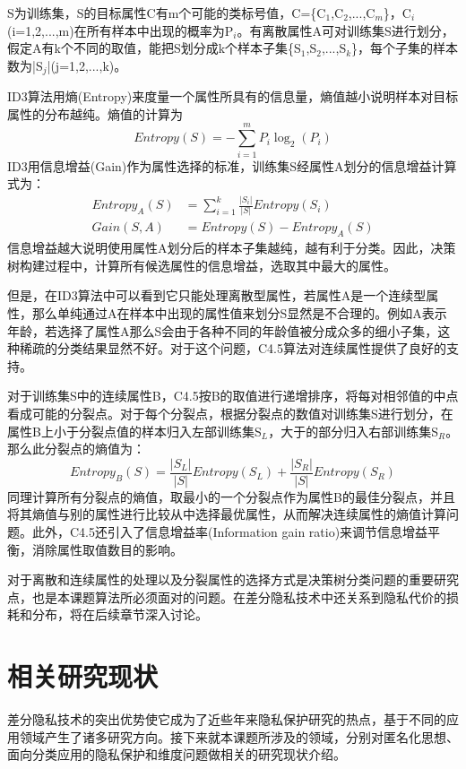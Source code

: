 \begin{exmp}
	\label{exmp_ID3}
	S为训练集，S的目标属性C有m个可能的类标号值，C=\{C$_{1}$,C$_{2}$,...,C$_{m}$\}，C$_{i}$(i=1,2,...,m)在所有样本中出现的概率为P$_{i}$。有离散属性A可对训练集S进行划分，假定A有k个不同的取值，能把S划分成k个样本子集\{S$_{1}$,S$_{2}$,...,S$_{k}$\}，每个子集的样本数为|S$_{j}$|(j=1,2,...,k)。
\end{exmp}
ID3算法用熵(Entropy)来度量一个属性所具有的信息量，熵值越小说明样本对目标属性的分布越纯。熵值的计算为
\[
	Entropy(S) = -\sum_{i=1}^{m}P_{i}\log_{2}(P_{i})
\]
ID3用信息增益(Gain)作为属性选择的标准，训练集S经属性A划分的信息增益计算式为：
\[
\begin{split}
	Entropy_{A}(S) &= \sum_{i=1}^{k}\frac{|S_{i}|}{|S|}Entropy(S_{i})\\
	Gain(S,A) &= Entropy(S)-Entropy_{A}(S)
\end{split}
\]
信息增益越大说明使用属性A划分后的样本子集越纯，越有利于分类。因此，决策树构建过程中，计算所有候选属性的信息增益，选取其中最大的属性。

但是，在ID3算法中可以看到它只能处理离散型属性，若属性A是一个连续型属性，那么单纯通过A在样本中出现的属性值来划分S显然是不合理的。例如A表示年龄，若选择了属性A那么S会由于各种不同的年龄值被分成众多的细小子集，这种稀疏的分类结果显然不好。对于这个问题，C4.5算法对连续属性提供了良好的支持。

对于训练集S中的连续属性B，C4.5按B的取值进行递增排序，将每对相邻值的中点看成可能的分裂点。对于每个分裂点，根据分裂点的数值对训练集S进行划分，在属性B上小于分裂点值的样本归入左部训练集S$_{L}$，大于的部分归入右部训练集S$_{R}$。那么此分裂点的熵值为：
\[
	Entropy_{B}(S) = \frac{|S_{L}|}{|S|}Entropy(S_{L})+\frac{|S_{R}|}{|S|}Entropy(S_{R})
\]
同理计算所有分裂点的熵值，取最小的一个分裂点作为属性B的最佳分裂点，并且将其熵值与别的属性进行比较从中选择最优属性，从而解决连续属性的熵值计算问题。此外，C4.5还引入了信息增益率(Information gain ratio)来调节信息增益平衡，消除属性取值数目的影响。

对于离散和连续属性的处理以及分裂属性的选择方式是决策树分类问题的重要研究点，也是本课题算法所必须面对的问题。在差分隐私技术中还关系到隐私代价的损耗和分布，将在后续章节深入讨论。

\section{相关研究现状} %

差分隐私技术的突出优势使它成为了近些年来隐私保护研究的热点，基于不同的应用领域产生了诸多研究方向。接下来就本课题所涉及的领域，分别对匿名化思想、面向分类应用的隐私保护和维度问题做相关的研究现状介绍。

